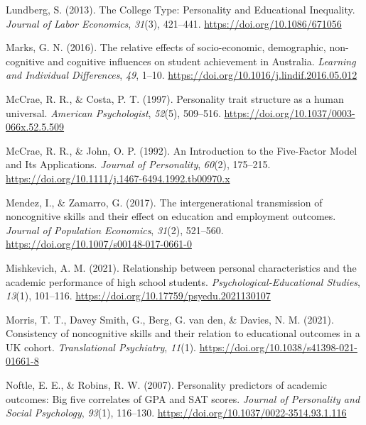 \documentclass[
  12pt,
  a4paper,
]{article}
\newlength{\cslhangindent}
\newlength{\cslentryspacingunit} %
\newenvironment{CSLReferences}[2] %
 {%
  \setlength{\parindent}{0pt}
  \ifodd #1
  \let\oldpar\par
  \def\par{\hangindent=\cslhangindent\oldpar}
  \fi
  \setlength{\parskip}{#2\cslentryspacingunit}
 }%
 {}
\begin{document}
\begin{CSLReferences}{1}{0}
\leavevmode{}%
Lundberg, S. (2013). The College Type: Personality and Educational
Inequality. \emph{Journal of Labor Economics}, \emph{31}(3), 421--441.
\url{https://doi.org/10.1086/671056}

\leavevmode{}%
Marks, G. N. (2016). The relative effects of socio-economic,
demographic, non-cognitive and cognitive influences on student
achievement in Australia. \emph{Learning and Individual Differences},
\emph{49}, 1--10. \url{https://doi.org/10.1016/j.lindif.2016.05.012}

\leavevmode{}%
McCrae, R. R., \& Costa, P. T. (1997). Personality trait structure as a
human universal. \emph{American Psychologist}, \emph{52}(5), 509--516.
\url{https://doi.org/10.1037/0003-066x.52.5.509}

\leavevmode{}%
McCrae, R. R., \& John, O. P. (1992). An Introduction to the
Five{-}Factor Model and Its Applications. \emph{Journal of Personality},
\emph{60}(2), 175--215.
\url{https://doi.org/10.1111/j.1467-6494.1992.tb00970.x}

\leavevmode{}%
Mendez, I., \& Zamarro, G. (2017). The intergenerational transmission of
noncognitive skills and their effect on education and employment
outcomes. \emph{Journal of Population Economics}, \emph{31}(2),
521--560. \url{https://doi.org/10.1007/s00148-017-0661-0}

\leavevmode{}%
Mishkevich, A. M. (2021). Relationship between personal characteristics
and the academic performance of high school students.
\emph{Psychological-Educational Studies}, \emph{13}(1), 101--116.
\url{https://doi.org/10.17759/psyedu.2021130107}

\leavevmode{}%
Morris, T. T., Davey Smith, G., Berg, G. van den, \& Davies, N. M.
(2021). Consistency of noncognitive skills and their relation to
educational outcomes in a UK cohort. \emph{Translational Psychiatry},
\emph{11}(1). \url{https://doi.org/10.1038/s41398-021-01661-8}

\leavevmode{}%
Noftle, E. E., \& Robins, R. W. (2007). Personality predictors of
academic outcomes: Big five correlates of GPA and SAT scores.
\emph{Journal of Personality and Social Psychology}, \emph{93}(1),
116--130. \url{https://doi.org/10.1037/0022-3514.93.1.116}


\end{CSLReferences}
\end{document}
